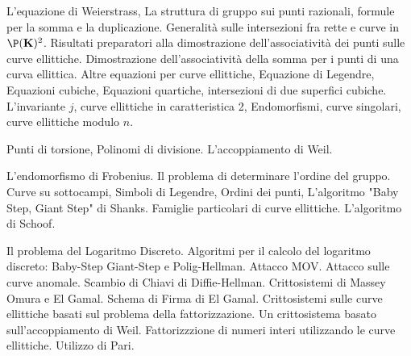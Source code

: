 
\def\abbrcorso{CR510}
\def\titolocorso{Crittosistemi ellittici }
\def\sottotitolo{http://www.mat.uniroma3.it/users/pappa/CORSI/CR510$_-$16$_-$17/CR510.htm}
\def\docente{Prof. Francesco Pappalardi}
\def\crediti{6}
\def\semestre{II}
\def\esoneri{0}
\def\scrittofinale{0}
\def\oralefinale{0}
\def\altreprove{1}
\Intestazione
{}

L'equazione di Weierstrass, La struttura di gruppo sui punti
razionali, formule per la somma e la duplicazione. Generalit\`a
sulle intersezioni fra rette e curve in $\P({\bf K})^2$. Risultati
preparatori alla dimostrazione dell'associativit\`a dei punti sulle
curve ellittiche. Dimostrazione dell'associa\-tivit\`a della somma
per i punti di una curva ellittica. Altre equazioni per curve
ellittiche, Equazione di Legendre, Equazioni cubiche, Equazioni
quartiche, intersezioni di due superfici cubiche. L'invariante $j$,
curve ellittiche in caratteristica 2, Endomorfismi, curve singolari,
curve ellittiche modulo $n$.


Punti di torsione, Polinomi di divisione. L'accoppiamento di Weil.


L'endomorfismo di Frobenius. Il problema di determinare l'ordine del
gruppo. Curve su sottocampi, Simboli di Legendre, Ordini dei punti,
L'algoritmo "Baby Step, Giant Step" di Shanks. Famiglie particolari
di curve ellittiche. L'algoritmo di Schoof.


Il problema del Logaritmo Discreto. Algoritmi per il calcolo del
logaritmo discreto: Baby-Step  Giant-Step e Polig-Hellman. Attacco
MOV. Attacco sulle curve anomale. Scambio di Chiavi di
Diffie-Hellman. Crittosistemi di Massey Omura e El Gamal. Schema
di Firma di El Gamal. Crittosistemi  sulle curve ellittiche basati
sul problema della fattorizzazione. Un crittosistema basato
sull'accoppiamento di Weil. Fattorizzzione di numeri interi
utilizzando le curve ellittiche. Utilizzo di Pari.

\testi
\bib
{}  
\endbib

\bib
{}   
\endbib

